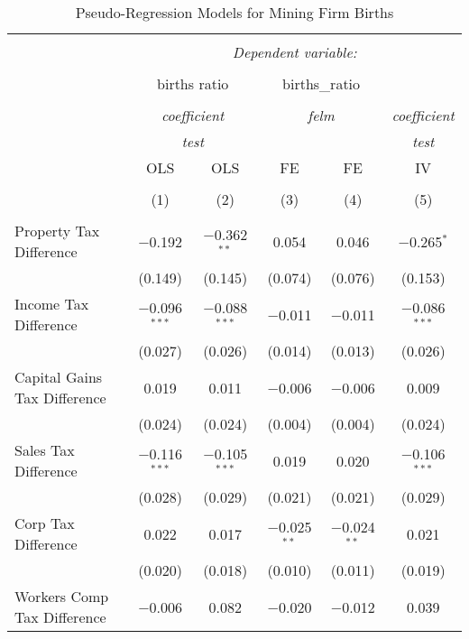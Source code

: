 
\begin{table}[!htbp] \centering 
  \caption{Pseudo-Regression Models for  Mining Firm Births} 
  \label{} 
\begin{tabular}{@{\extracolsep{5pt}}lccccc} 
\\[-1.8ex]\hline 
\hline \\[-1.8ex] 
 & \multicolumn{5}{c}{\textit{Dependent variable:}} \\ 
\cline{2-6} 
\\[-1.8ex] & \multicolumn{2}{c}{births ratio} & \multicolumn{2}{c}{births\_ratio} &   \\ 
\\[-1.8ex] & \multicolumn{2}{c}{\textit{coefficient}} & \multicolumn{2}{c}{\textit{felm}} & \textit{coefficient} \\ 
 & \multicolumn{2}{c}{\textit{test}} & \multicolumn{2}{c}{\textit{}} & \textit{test} \\ 
 & OLS & OLS & FE & FE & IV \\ 
\\[-1.8ex] & (1) & (2) & (3) & (4) & (5)\\ 
\hline \\[-1.8ex] 
 Property Tax Difference & $-$0.192 & $-$0.362$^{**}$ & 0.054 & 0.046 & $-$0.265$^{*}$ \\ 
  & (0.149) & (0.145) & (0.074) & (0.076) & (0.153) \\ 
  Income Tax Difference & $-$0.096$^{***}$ & $-$0.088$^{***}$ & $-$0.011 & $-$0.011 & $-$0.086$^{***}$ \\ 
  & (0.027) & (0.026) & (0.014) & (0.013) & (0.026) \\ 
  Capital Gains Tax Difference & 0.019 & 0.011 & $-$0.006 & $-$0.006 & 0.009 \\ 
  & (0.024) & (0.024) & (0.004) & (0.004) & (0.024) \\ 
  Sales Tax Difference & $-$0.116$^{***}$ & $-$0.105$^{***}$ & 0.019 & 0.020 & $-$0.106$^{***}$ \\ 
  & (0.028) & (0.029) & (0.021) & (0.021) & (0.029) \\ 
  Corp Tax Difference & 0.022 & 0.017 & $-$0.025$^{**}$ & $-$0.024$^{**}$ & 0.021 \\ 
  & (0.020) & (0.018) & (0.010) & (0.011) & (0.019) \\ 
  Workers Comp Tax Difference & $-$0.006 & 0.082 & $-$0.020 & $-$0.012 & 0.039 \\ 

\end{tabular}
\end{table}
